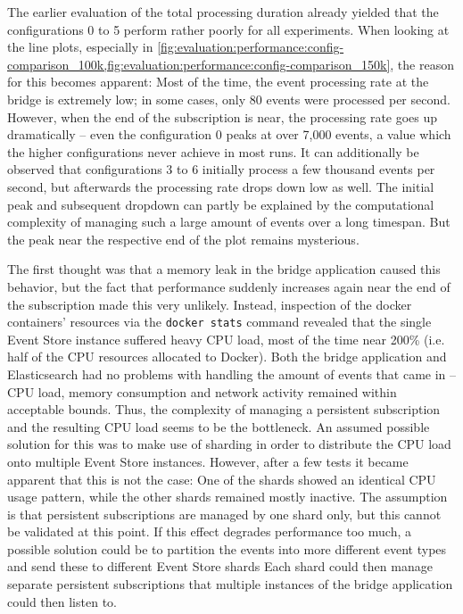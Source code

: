 The earlier evaluation of the total processing duration already yielded that the configurations 0 to 5 perform rather poorly for all experiments.
When looking at the line plots, especially in \cref{fig:evaluation:performance:config-comparison_100k,fig:evaluation:performance:config-comparison_150k}, the reason for this becomes apparent:
Most of the time, the event processing rate at the bridge is extremely low; in some cases, only 80 events were processed per second.
However, when the end of the subscription is near, the processing rate goes up dramatically -- even the configuration 0 peaks at over 7,000 events, a value which the higher configurations never achieve in most runs.
It can additionally be observed that configurations 3 to 6 initially process a few thousand events per second, but afterwards the processing rate drops down low as well.
The initial peak and subsequent dropdown can partly be explained by the computational complexity of managing such a large amount of events over a long timespan.
But the peak near the respective end of the plot remains mysterious.

The first thought was that a memory leak in the bridge application caused this behavior, but the fact that performance suddenly increases again near the end of the subscription made this very unlikely.
Instead, inspection of the docker containers' resources via the \texttt{docker stats} command revealed that the single Event Store instance suffered heavy CPU load, most of the time near 200\% (i.e. half of the CPU resources allocated to Docker).
Both the bridge application and Elasticsearch had no problems with handling the amount of events that came in -- CPU load, memory consumption and network activity remained within acceptable bounds.
Thus, the complexity of managing a persistent subscription and the resulting CPU load seems to be the bottleneck.
An assumed possible solution for this was to make use of sharding in order to distribute the CPU load onto multiple Event Store instances.
However, after a few tests it became apparent that this is not the case: One of the shards showed an identical CPU usage pattern, while the other shards remained mostly inactive.
The assumption is that persistent subscriptions are managed by one shard only, but this cannot be validated at this point.
If this effect degrades performance too much, a possible solution could be to partition the events into more different event types and send these to different Event Store shards
Each shard could then manage separate persistent subscriptions that multiple instances of the bridge application could then listen to.

